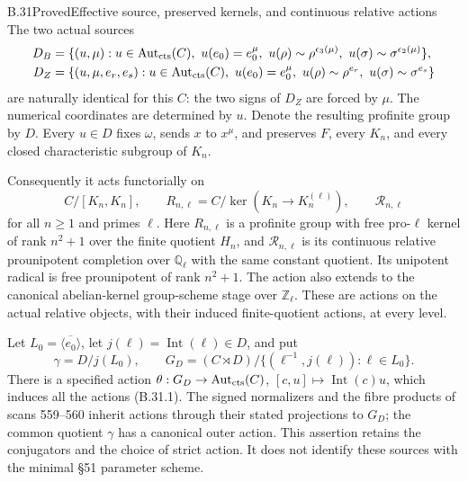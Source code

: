 \begin{statement}{B.31}{Proved}{Effective source, preserved kernels, and continuous relative actions}
The two actual sources
\[
\begin{aligned}
D_B={}&\{(u,\mu):u\in\operatorname{Aut}_{\rm cts}(C),\
 u(e_0)=e_0^\mu,\
 u(\rho)\sim\rho^{\epsilon_3(\mu)},\
 u(\sigma)\sim\sigma^{\epsilon_2(\mu)}\},\\
D_Z={}&\{(u,\mu,e_r,e_s):u\in\operatorname{Aut}_{\rm cts}(C),\
 u(e_0)=e_0^\mu,\
 u(\rho)\sim\rho^{e_r},\
 u(\sigma)\sim\sigma^{e_s}\}
\end{aligned}
\]
are naturally identical for this $C$: the two signs of $D_Z$
are forced by $\mu$. The numerical coordinates are determined
by $u$. Denote the resulting profinite group by $D$.
Every $u\in D$ fixes $\omega$, sends $x$ to $x^\mu$, and
preserves $F$, every $K_n$, and every closed characteristic
subgroup of $K_n$.

Consequently it acts functorially on
\[
 C/[K_n,K_n],\qquad
 R_{n,\ell}=C/\ker(K_n\longrightarrow K_n^{(\ell)}),
 \qquad \mathcal R_{n,\ell}
                                                        \tag{B.31.1}
\]
for all $n\ge1$ and primes $\ell$. Here $R_{n,\ell}$ is
a profinite group with free pro-$\ell$ kernel of rank $n^2+1$
over the finite quotient $H_n$, and $\mathcal R_{n,\ell}$ is
its continuous relative prounipotent completion over
$\mathbb Q_\ell$ with the same constant quotient.
Its unipotent radical is free prounipotent of rank $n^2+1$.
The action also extends to the canonical abelian-kernel
group-scheme stage over $\mathbb Z_\ell$.
These are actions on the actual relative objects, with
their induced finite-quotient actions, at every level.

Let $L_0=\overline{\langle e_0\rangle}$, let
$j(\ell)=\operatorname{Int}(\ell)\in D$, and put
\[
 \gamma=D/j(L_0),\qquad
 G_D=(C\rtimes D)/\{(\ell^{-1},j(\ell)):\ell\in L_0\}.
                                                        \tag{B.31.2}
\]
There is a specified action
$\theta:G_D\to\operatorname{Aut}_{\rm cts}(C)$,
$[c,u]\mapsto\operatorname{Int}(c)u$, which induces all
the actions (B.31.1). The signed normalizers and the
fibre products of scans 559--560 inherit actions through
their stated projections to $G_D$; the common quotient
$\gamma$ has a canonical outer action. This assertion
retains the conjugators and the choice of strict action.
It does not identify these sources with the minimal
\S51 parameter scheme.
\end{statement}
